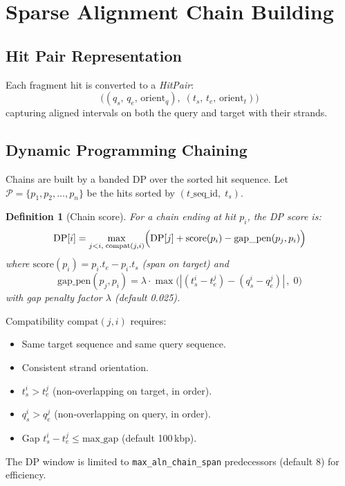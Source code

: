\documentclass[11pt,a4paper]{article}
\newtheorem{definition}{Definition}[section]
\begin{document}
\section{Sparse Alignment Chain Building}
\label{sec:chain}

\subsection{Hit Pair Representation}

Each fragment hit is converted to a \emph{HitPair}:
\[
  \bigl((q_s,\, q_e,\, \text{orient}_q),\; (t_s,\, t_e,\, \text{orient}_t)\bigr)
\]
capturing aligned intervals on both the query and target with their strands.

\subsection{Dynamic Programming Chaining}

Chains are built by a banded DP over the sorted hit sequence.
Let $\mathcal{P} = \{p_1, p_2, \ldots, p_n\}$ be the hits sorted by
$(t\_\text{seq\_id},\; t_s)$.

\begin{definition}[Chain score]
  For a chain ending at hit $p_i$, the DP score is:
  \[
    \mathrm{DP}[i] = \max_{j < i,\; \text{compat}(j,i)}
      \Bigl(\mathrm{DP}[j] + \mathrm{score}(p_i) - \mathrm{gap\_pen}(p_j, p_i)\Bigr)
  \]
  where $\mathrm{score}(p_i) = p_i.t_e - p_i.t_s$ (span on target) and
  \[
    \mathrm{gap\_pen}(p_j, p_i) = \lambda \cdot
      \max\bigl(|{(t_s^i - t_e^j)} - (q_s^i - q_e^j)|\,,\; 0\bigr)
  \]
  with gap penalty factor $\lambda$ (default 0.025).
\end{definition}

Compatibility $\mathrm{compat}(j, i)$ requires:
\begin{itemize}[noitemsep]
  \item Same target sequence and same query sequence.
  \item Consistent strand orientation.
  \item $t_s^i > t_e^j$ (non-overlapping on target, in order).
  \item $q_s^i > q_e^j$ (non-overlapping on query, in order).
  \item Gap $t_s^i - t_e^j \leq \text{max\_gap}$ (default 100\,kbp).
\end{itemize}

The DP window is limited to \texttt{max\_aln\_chain\_span} predecessors
(default 8) for efficiency.
\end{document}
